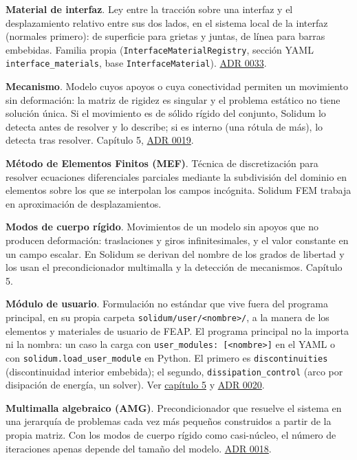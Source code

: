 \documentclass[11pt,oneside]{report}
\begin{document}
\textbf{Material de interfaz}. Ley entre la tracción sobre una interfaz y el desplazamiento relativo entre sus dos lados, en el sistema local de la interfaz (normales primero): de superficie para grietas y juntas, de línea para barras embebidas. Familia propia (\texttt{InterfaceMaterialRegistry}, sección YAML \texttt{interface\_\allowbreak{}materials}, base \texttt{InterfaceMaterial}). \hyperref[adr:0033]{ADR 0033}.

\textbf{Mecanismo}. Modelo cuyos apoyos o cuya conectividad permiten un movimiento sin deformación: la matriz de rigidez es singular y el problema estático no tiene solución única. Si el movimiento es de sólido rígido del conjunto, Solidum lo detecta antes de resolver y lo describe; si es interno (una rótula de más), lo detecta tras resolver. Capítulo 5, \hyperref[adr:0019]{ADR 0019}.

\textbf{Método de Elementos Finitos (MEF)}. Técnica de discretización para resolver ecuaciones diferenciales parciales mediante la subdivisión del dominio en elementos sobre los que se interpolan los campos incógnita. Solidum FEM trabaja en aproximación de desplazamientos.

\textbf{Modos de cuerpo rígido}. Movimientos de un modelo sin apoyos que no producen deformación: traslaciones y giros infinitesimales, y el valor constante en un campo escalar. En Solidum se derivan del nombre de los grados de libertad y los usan el precondicionador multimalla y la detección de mecanismos. Capítulo 5.

\textbf{Módulo de usuario}. Formulación no estándar que vive fuera del programa principal, en su propia carpeta \texttt{solidum/\allowbreak{}user/\allowbreak{}\textless{}nombre\textgreater{}/\allowbreak{}}, a la manera de los elementos y materiales de usuario de FEAP. El programa principal no la importa ni la nombra: un caso la carga con \texttt{user\_\allowbreak{}modules: [\textless{}nombre\textgreater{}]} en el YAML o con \texttt{solidum.\allowbreak{}load\_\allowbreak{}user\_\allowbreak{}module} en Python. El primero es \texttt{discontinuities} (discontinuidad interior embebida); el segundo, \texttt{dissipation\_\allowbreak{}control} (arco por disipación de energía, un solver). Ver \hyperref[cap:5]{capítulo 5} y \hyperref[adr:0020]{ADR 0020}.

\textbf{Multimalla algebraico (AMG)}. Precondicionador que resuelve el sistema en una jerarquía de problemas cada vez más pequeños construidos a partir de la propia matriz. Con los modos de cuerpo rígido como casi-núcleo, el número de iteraciones apenas depende del tamaño del modelo. \hyperref[adr:0018]{ADR 0018}.
\end{document}
